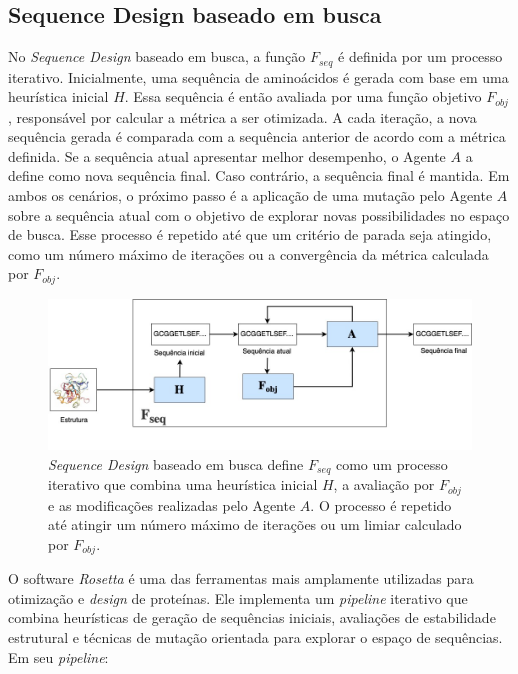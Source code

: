 \subsection{Sequence Design baseado em busca}

No \textit{Sequence Design} baseado em busca, 
a função $F_{seq}$ é definida por um processo iterativo. 
Inicialmente, uma sequência de aminoácidos é gerada com base em uma heurística inicial $H$.
Essa sequência é então avaliada por uma função objetivo $F_{obj}$, 
responsável por calcular a métrica a ser otimizada.
A cada iteração, 
a nova sequência gerada é comparada com a sequência anterior de acordo com a métrica definida. 
Se a sequência atual apresentar melhor desempenho, o Agente $A$ a define como nova sequência final.
Caso contrário, a sequência final é mantida. 
Em ambos os cenários, o próximo passo é a aplicação de uma mutação pelo Agente $A$ sobre 
a sequência atual com o objetivo de explorar novas possibilidades no espaço de busca.
Esse processo é repetido até que um critério de parada seja atingido, 
como um número máximo de iterações ou a convergência da métrica calculada por $F_{obj}$.


\begin{figure}[H]
  \centering
  \includegraphics[width=.8\textwidth]{figuras/metodologia-SearchBased.jpg}
  \caption[\textit{Sequence Design} baseado em busca]{\textit{Sequence Design} baseado em busca define $F_{seq}$ 
           como um processo iterativo que combina uma 
           heurística inicial $H$, a avaliação por $F_{obj}$ e as modificações realizadas pelo Agente $A$. 
           O processo é repetido até atingir um número máximo de iterações ou um limiar calculado por $F_{obj}$.}
  \label{fig:seqdes_search_based}
\end{figure}

O software \textit{Rosetta} \cite{Rosetta} é uma das ferramentas 
mais amplamente utilizadas para otimização e \textit{design} de proteínas.
Ele implementa um \textit{pipeline} iterativo que combina heurísticas de geração de sequências iniciais, 
avaliações de estabilidade estrutural e técnicas de mutação orientada para explorar o espaço de sequências.
Em seu \textit{pipeline}:


